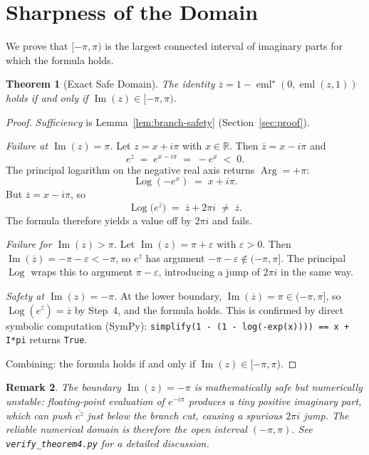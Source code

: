 \documentclass[11pt,a4paper]{article}
\newtheorem{theorem}{Theorem}[section]
\newtheorem{remark}[theorem]{Remark}
\theoremstyle{definition}
\newcommand{\eml}{\operatorname{eml}}
\newcommand{\emlstar}{\operatorname{eml}^\star}
\newcommand{\Log}{\operatorname{Log}}   %
\newcommand{\Arg}{\operatorname{Arg}}   %
\newcommand{\conj}[1]{\overline{#1}}
\newcommand{\R}{\mathbb{R}}
\newcommand{\im}{\operatorname{Im}}
\begin{document}
\section{Sharpness of the Domain}
\label{sec:sharpness}

We prove that $[-\pi,\pi)$ is the largest connected interval of imaginary
parts for which the formula holds.

\begin{theorem}[Exact Safe Domain]
\label{thm:domain}
The identity $\conj{z}=1-\emlstar(0,\eml(z,1))$ holds if and only if
$\im(z)\in[-\pi,\pi)$.
\end{theorem}

\begin{proof}
\emph{Sufficiency} is Lemma~\ref{lem:branch-safety} (Section~\ref{sec:proof}).

\emph{Failure at $\im(z)=\pi$.}
Let $z=x+i\pi$ with $x\in\R$.  Then $\conj{z}=x-i\pi$ and
\[
  e^{\conj{z}} \;=\; e^{x-i\pi} \;=\; -e^x \;<\; 0.
\]
The principal logarithm on the negative real axis returns $\Arg=+\pi$:
\[
  \Log(-e^x) \;=\; x + i\pi.
\]
But $\conj{z}=x-i\pi$, so
\[
  \Log\!\bigl(e^{\conj{z}}\bigr) \;=\; \conj{z}+2\pi i \;\neq\; \conj{z}.
\]
The formula therefore yields a value off by $2\pi i$ and fails.

\emph{Failure for $\im(z)>\pi$.}
Let $\im(z)=\pi+\varepsilon$ with $\varepsilon>0$.  Then
$\im(\conj{z})=-\pi-\varepsilon<-\pi$, so $e^{\conj{z}}$ has argument
$-\pi-\varepsilon\notin(-\pi,\pi]$.  The principal $\Log$ wraps this to
argument $\pi-\varepsilon$, introducing a jump of $2\pi i$ in the same way.

\emph{Safety at $\im(z)=-\pi$.}
At the lower boundary, $\im(\conj{z})=\pi\in(-\pi,\pi]$, so
$\Log(e^{\conj{z}})=\conj{z}$ by Step~4, and the formula holds.
This is confirmed by direct symbolic computation (SymPy):
\texttt{simplify(1 - (1 - log(-exp(x)))) == x + I*pi} returns \texttt{True}.

Combining: the formula holds if and only if $\im(z)\in[-\pi,\pi)$.
\end{proof}

\begin{remark}
The boundary $\im(z)=-\pi$ is mathematically safe but numerically unstable:
floating-point evaluation of $e^{-i\pi}$ produces a tiny positive imaginary
part, which can push $\conj{e^z}$ just below the branch cut, causing a
spurious $2\pi i$ jump.  The reliable numerical domain is therefore the open
interval $(-\pi,\pi)$.  See \texttt{verify\_theorem4.py} for a detailed
discussion.
\end{remark}
\end{document}
